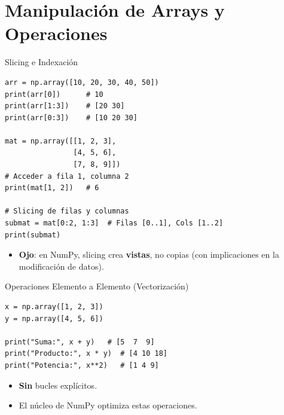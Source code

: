 \documentclass[10pt]{beamer}
\begin{document}
\section{Manipulación de Arrays y Operaciones}

\begin{frame}[fragile]{Slicing e Indexación}
\begin{verbatim}
arr = np.array([10, 20, 30, 40, 50])
print(arr[0])      # 10
print(arr[1:3])    # [20 30]
print(arr[0:3])    # [10 20 30]

mat = np.array([[1, 2, 3],
                [4, 5, 6],
                [7, 8, 9]])
# Acceder a fila 1, columna 2
print(mat[1, 2])   # 6

# Slicing de filas y columnas
submat = mat[0:2, 1:3]  # Filas [0..1], Cols [1..2]
print(submat)
\end{verbatim}
\begin{itemize}
  \item \textbf{Ojo}: en NumPy, slicing crea \textbf{vistas}, no copias (con implicaciones en la modificación de datos).
\end{itemize}
\end{frame}

\begin{frame}[fragile]{Operaciones Elemento a Elemento (Vectorización)}
\begin{verbatim}
x = np.array([1, 2, 3])
y = np.array([4, 5, 6])

print("Suma:", x + y)   # [5  7  9]
print("Producto:", x * y)  # [4 10 18]
print("Potencia:", x**2)   # [1 4 9]
\end{verbatim}
\begin{itemize}
  \item \textbf{Sin} bucles explícitos.
  \item El núcleo de NumPy optimiza estas operaciones.
\end{itemize}
\end{frame}
\end{document}
